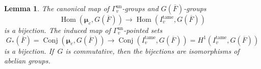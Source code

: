 \documentclass[a4paper,english,12pt]{amsart}
\newcommand{\oF}{\overline F}
\newcommand{\muu}{\boldsymbol{\mu}}
\DeclareMathOperator{\Conj}{Conj}
\DeclareMathOperator{\Hom}{Hom}
\DeclareMathOperator{\un}{un}
\DeclareMathOperator{\tame}{{tame}}
\newtheorem{lem}[equation]{Lemma}
\numberwithin{equation}{subsection}
\begin{document}
\begin{lem}\label{indmue} The canonical map of $\Gamma_v^{\un}$-groups and $G(\oF)$-groups
\begin{equation}
\label{oglic}
\Hom(\muu_e, G(\oF))\to\Hom (I_v^{\tame}, G(\oF))
\end{equation} %
is a bijection. The induced map of $\Gamma_v^{\un}$-pointed sets $$G_*(\oF)=\Conj(\muu_e, G(\oF))\to\Conj(I_v^{\tame}, G(\oF))=H^1(I_v^{\tame}, G(\oF))$$ is a bijection. %
If~$G$ is commutative, then the bijections are isomorphisms of abelian groups.
\end{lem}
\end{document}
